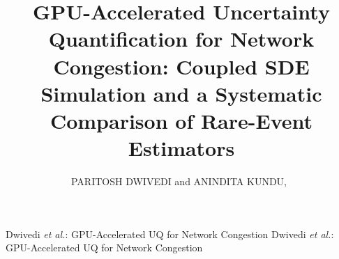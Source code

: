 \documentclass{ieeeaccess}
\begin{document}

\title{GPU-Accelerated Uncertainty Quantification for Network Congestion: Coupled SDE Simulation and a Systematic Comparison of Rare-Event Estimators}

\author{
\uppercase{Paritosh Dwivedi} and
\uppercase{Anindita Kundu},~
}

\address[1]{School of Computer Science and Engineering, Vellore Institute of Technology,
Vellore 632014, India (e-mail: paritoshdwi2019@gmail.com;
anindita.kundu@vit.ac.in)}


\markboth
{Dwivedi \MakeLowercase{\textit{et al.}}: GPU-Accelerated UQ for Network Congestion}
{Dwivedi \MakeLowercase{\textit{et al.}}: GPU-Accelerated UQ for Network Congestion}

\end{document}
